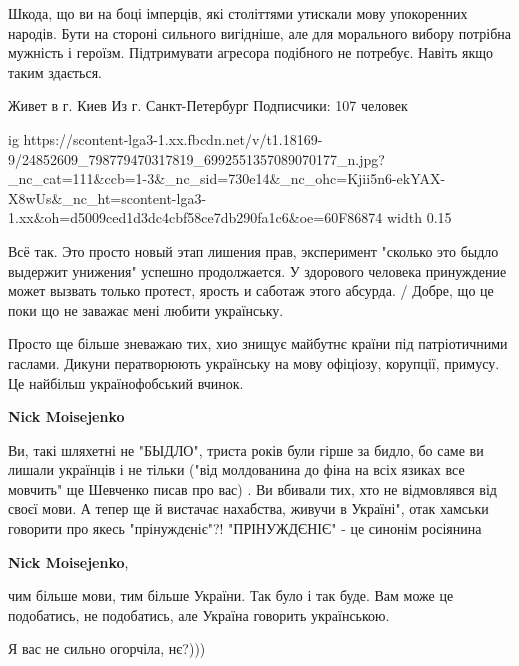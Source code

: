 Шкода, що ви на боці імперців, які століттями утискали мову упокоренних
народів. Бути на стороні сильного вигідніше, але для морального вибору потрібна
мужність і героїзм. Підтримувати агресора подібного не потребує. Навіть якщо
таким здається.

Живет в г. Киев
Из г. Санкт-Петербург
Подписчики: 107 человек
\par
\ifcmt
  ig https://scontent-lga3-1.xx.fbcdn.net/v/t1.18169-9/24852609_798779470317819_6992551357089070177_n.jpg?_nc_cat=111&ccb=1-3&_nc_sid=730e14&_nc_ohc=Kjii5n6-ekYAX-X8wUs&_nc_ht=scontent-lga3-1.xx&oh=d5009ced1d3dc4cbf58ce7db290fa1c6&oe=60F86874
  width 0.15
\fi


Всё так. Это просто новый этап лишения прав, эксперимент "сколько это быдло
выдержит унижения" успешно продолжается. У здорового человека принуждение может
вызвать только протест, ярость и саботаж этого абсурда. / Добре, що це поки що
не заважає мені любити українську. 

Просто ще більше зневажаю тих, хио знищує майбутнє країни під патріотичними
гаслами. Дикуни ператворюють українську на мову офіціозу, корупції, примусу. Це
найбільш українофобський вчинок.

\begin{itemize}

\textbf{Nick Moisejenko} 

Ви, такі шляхетні не "БЫДЛО", триста років були гірше
за бидло, бо саме ви лишали українців і не тільки ("від молдованина до фіна на
всіх язиках все мовчить" ще Шевченко писав про вас) . Ви вбивали тих, хто не
відмовлявся від своєї мови. А тепер ще й вистачає нахабства, живучи в Україні",
отак хамськи говорити про якесь "прінуждєніє"?! "ПРІНУЖДЄНІЄ" - це синонім
росіянина


\textbf{Nick Moisejenko}, 

чим більше мови, тим більше України. Так було і так буде. Вам може це
подобатись, не подобатись, але Україна говорить українською.

Я вас не сильно огорчіла, нє?)))\Laughey[1.0][white]\Laughey[1.0][white]\Laughey[1.0][white]
💙💛
\end{itemize}

